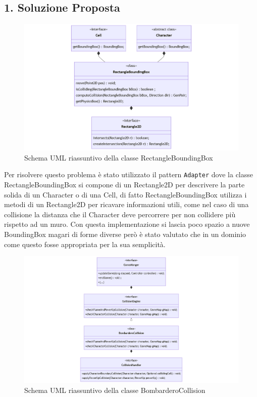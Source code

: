 \documentclass[a4paper,12pt]{report}
\begin{document}
\subsection*{1. Soluzione Proposta}

\begin{figure}[H]
\centering{}
\includegraphics[width=\textwidth]{img/RectangleBoundingBox.png}
\caption{Schema UML riassuntivo della classe RectangleBoundingBox}
\end{figure}

\par
Per risolvere questo problema è stato utilizzato il pattern \verb|Adapter| dove la classe RectangleBoundingBox si compone di un Rectangle2D per descrivere la parte solida di un Character o di una Cell, di fatto RectangleBoundingBox utilizza i metodi di un Rectangle2D per ricavare informazioni utili, come nel caso di una collisione la distanza che il Character deve percorrere per non collidere più rispetto ad un muro.
Con questa implementazione si lascia poco spazio a nuove BoundingBox magari di forme diverse però è stato valutato che in un dominio come questo fosse appropriata per la sua semplicità. 


\begin{figure}[H]
\centering{}
\includegraphics[width=\textwidth]{img/CollisionEngine.png}
\caption{Schema UML riassuntivo della classe BombarderoCollision}
\end{figure}
\end{document}
